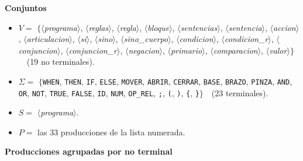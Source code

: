 \documentclass[10pt,a4paper]{article}
\newcommand{\nt}[1]{\ensuremath{\langle}\textit{#1}\ensuremath{\rangle}}   %
\newcommand{\tm}[1]{\texttt{#1}}                                          %
\begin{document}
\textbf{Conjuntos}
\begin{itemize}[nosep]
\item $V = $ \ensuremath{\{}\nt{programa}, \nt{reglas}, \nt{regla}, \nt{bloque}, \nt{sentencias}, \nt{sentencia}, \nt{accion}, \nt{articulacion}, \nt{si}, \nt{sino}, \nt{sino\_cuerpo}, \nt{condicion}, \nt{condicion\_r}, \nt{conjuncion}, \nt{conjuncion\_r}, \nt{negacion}, \nt{primario}, \nt{comparacion}, \nt{valor}\ensuremath{\}}\ \ (19 no terminales).
\item $\Sigma = $ \ensuremath{\{}\tm{WHEN}, \tm{THEN}, \tm{IF}, \tm{ELSE}, \tm{MOVER}, \tm{ABRIR}, \tm{CERRAR}, \tm{BASE}, \tm{BRAZO}, \tm{PINZA}, \tm{AND}, \tm{OR}, \tm{NOT}, \tm{TRUE}, \tm{FALSE}, \tm{ID}, \tm{NUM}, \tm{OP\_REL}, \tm{;}, \tm{(}, \tm{)}, \tm{\{}, \tm{\}}\ensuremath{\}}\ \ (23 terminales).
\item $S = $ \nt{programa}.
\item $P = $ las 33 producciones de la lista numerada.\end{itemize}
\textbf{Producciones agrupadas por no terminal}
\end{document}
